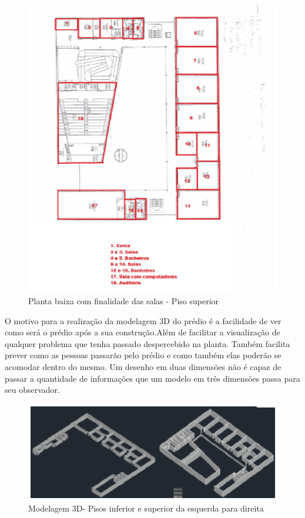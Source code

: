 \begin{figure}[!ht]
  \centering
  \includegraphics[keepaspectratio=true,scale=1]{figuras/plantabaixa2.eps}
  \caption{Planta baixa com finalidade das salas - Piso superior}
  \label{fig:planta_salas_superior}
\end{figure}

O motivo para a realização da modelagem 3D do prédio é a facilidade de ver como será o prédio após a sua construção.Além de facilitar a visualização de qualquer problema que tenha passado despercebido na planta. Também facilita prever como as pessoas passarão pelo prédio e como também elas poderão se acomodar dentro do mesmo. Um desenho em duas dimensões não é capaz de passar a quantidade de informações que um modelo em três dimensões passa para seu observador.

\begin{figure}[!ht]
  \centering
  \includegraphics[keepaspectratio=true,scale=1]{figuras/modelagemautocad.eps}
  \caption{Modelagem 3D- Pisos inferior e superior da esquerda para direita}
  \label{fig:modelagem_3d}
\end{figure}

